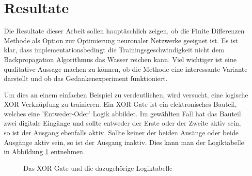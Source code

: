 \section{Resultate
	\label{ableitung:section:resultate}}
Die Resultate dieser Arbeit sollen hauptäschlich zeigen, ob die Finite Differenzen Methode als Option zur Optimierung neuronaler Netzwerke geeignet ist. Es ist klar, dass implementationsbedingt die Trainingsgeschwindigkeit nicht dem Backpropagation Algorithmus das Wasser reichen kann. Viel wichtiger ist eine qualitative Aussage machen zu können, ob die Methode eine interessante Variante darstellt und ob das Gedankenexperiment funktioniert.

Um dies an einem einfachen Beispiel zu verdeutlichen, wird versucht, eine logische XOR Verknüpfung zu trainieren. Ein XOR-Gate ist ein elektronisches Bauteil, welches eine 'Entweder-Oder' Logik abbildet. Im gewählten Fall hat das Bauteil zwei digitale Eingänge und sollte entweder der Erste oder der Zweite aktiv sein, so ist der Ausgang ebenfalls aktiv. Sollte keiner der beiden Ausänge oder beide Ausgänge aktiv sein, so ist der Ausgang inaktiv. Dies kann man der Logiktabelle in Abbildung \ref{ableitung:fig:xor-gate-logic} entnehmen.
\begin{figure}[h]
	 \centering
	\caption{Das XOR-Gate und die dazugehörige Logiktabelle}
	\label{ableitung:fig:xor-gate-logic}
\end{figure}
